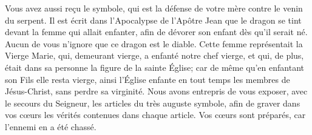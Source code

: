 Vous avez aussi reçu le symbole,
	qui est la défense de votre mère contre le venin du serpent.
Il est écrit dans l’Apocalypse de l’Apôtre Jean
	que le dragon se tint devant la femme qui allait enfanter,
	afin de dévorer son enfant dès qu’il serait né.
Aucun de vous n’ignore que ce dragon est le diable.
Cette femme représentait la Vierge Marie,
	qui, demeurant vierge, a enfanté notre chef vierge,
	et qui, de plus, était dans sa personne la figure de la sainte Église;
	car de même qu’en enfantant son Fils elle resta vierge,
	ainsi l’Église enfante en tout temps les membres de Jésus-Christ,
	sans perdre sa virginité.
Nous avons entrepris de vous exposer, avec le secours du Seigneur,
	les articles du très auguste symbole,
	afin de graver dans vos cœurs les vérités contenues dans chaque article.
Vos cœurs sont préparés, car l’ennemi en a été chassé.
